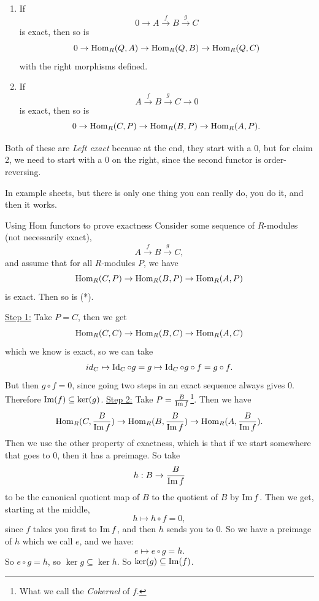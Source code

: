 \documentclass{article}
\begin{document}
\begin{fancyprop}{}\hspace{0.1cm}
    \begin{enumerate}
        \item If \[ 0 \rightarrow A \xrightarrow{f} B \xrightarrow{g} C \] is exact, then so is
        \[ 0 \rightarrow \operatorname{Hom}_{R}(Q,A) \rightarrow \operatorname{Hom}_{R}(Q,B) \rightarrow \operatorname{Hom}_{R}(Q,C)\] with the right morphisms defined.
        \item If \[ A \xrightarrow{f} B \xrightarrow{g} C \rightarrow 0 \] is exact, then so is \[ 0 \rightarrow \operatorname{Hom}_{R}(C,P) \rightarrow \operatorname{Hom}_{R}(B,P) \rightarrow \operatorname{Hom}_{R}(A,P).\]
    \end{enumerate}
    Both of these are \textit{Left exact} because at the end, they start with a $0$, but for claim 2, we need to start with a $0$ on the right, since the second functor is order-reversing.
\end{fancyprop}
\proof In example sheets, but there is only one thing you can really do, you do it, and then it works.
\begin{fancylem}{Using Hom functors to prove exactness}
    Consider some sequence of $R$-modules (not necessarily exact), \[ A \xrightarrow{f} B \xrightarrow{g} C, \tag{*} \] and assume that for all $R$-modules $P$, we have \[ \operatorname{Hom}_{R}(C,P) \rightarrow \operatorname{Hom}_{R}(B,P) \rightarrow \operatorname{Hom}_{R}(A,P) \] is exact. Then so is (*).
\end{fancylem}
\proof \hspace{0.1cm} \underline{Step 1:} Take $P=C$, then we get \[ \operatorname{Hom}_{R}(C,C) \rightarrow \operatorname{Hom}_{R}(B,C) \rightarrow \operatorname{Hom}_{R}(A,C) \] which we know is exact, so we can take \[ id_{C} \mapsto \operatorname{Id}_{C} \circ g = g \mapsto \operatorname{Id}_{C} \circ g \circ f = g \circ f. \] But then $g \circ f = 0$, since going two steps in an exact sequence always gives $0$. Therefore $\operatorname{Im}(f) \subseteq \ker(g)$.
\gap \underline{Step 2:} Take $P=\frac{B}{\operatorname{Im} f}$\footnote{What we call the \textit{Cokernel} of $f$.}. Then we have \[ \operatorname{Hom}_{R}(C, \frac{B}{\operatorname{Im} f}) \rightarrow \operatorname{Hom}_{R}(B, \frac{B}{\operatorname{Im} f}) \rightarrow \operatorname{Hom}_{R}(A, \frac{B}{\operatorname{Im} f}).\] Then we use the other property of exactness, which is that if we start somewhere that goes to $0$, then it has a preimage. So take \[ h: B \to \frac{B}{\operatorname{Im} f}\] to be the canonical quotient map of $B$ to the quotient of $B$ by $\operatorname{Im} f$. Then we get, starting at the middle, \[ h \mapsto h \circ f = 0, \] since $f$ takes you first to $\operatorname{Im} f$, and then $h$ sends you to $0$. So we have a preimage of $h$ which we call $e$, and we have: \[ e \mapsto e \circ g = h.\] So $e \circ g = h$, so $\ker g \subseteq \ker h$. So $\ker(g) \subseteq \operatorname{Im}(f)$. \endproof
\end{document}
